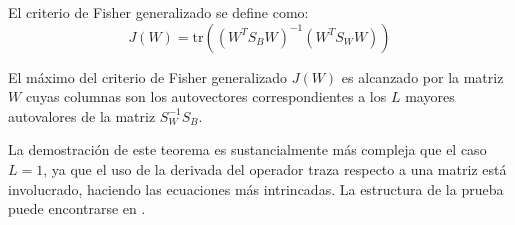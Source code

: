 \begin{definition}
El criterio de Fisher generalizado se define como:
\[
J(W) = \text{tr}((W^T S_B W)^{-1} (W^T S_W W))
\]
\end{definition}

\begin{theorem}
El máximo del criterio de Fisher generalizado $J(W)$ es alcanzado por la matriz $W$ cuyas columnas son los autovectores correspondientes a los $L$ mayores autovalores de la matriz $S_W^{-1} S_B$.
\end{theorem}

La demostración de este teorema es sustancialmente más compleja que el caso $L=1$, ya que el uso de la derivada del operador traza respecto a una matriz está involucrado, haciendo las ecuaciones más intrincadas. La estructura de la prueba puede encontrarse en \cite{fukunaga1990introduction}.
